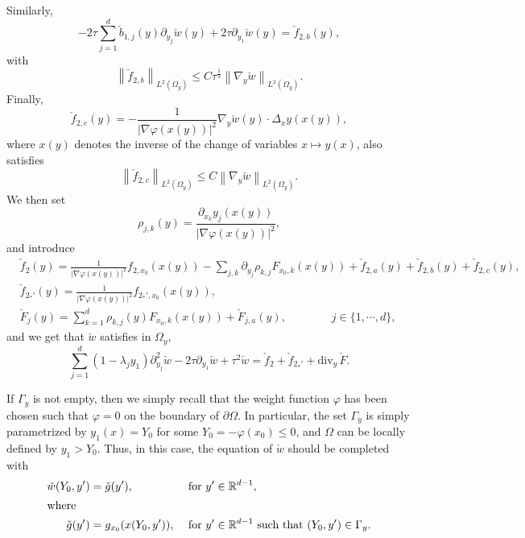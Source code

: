 \documentclass[AHL,Unicode,longabstracts]{cedram}
\newcommand*\R{\mathbb{R}}
\renewcommand{\leq}{\leqslant}
\begin{document}
Similarly,
\[
-2 \tau \sum_{j = 1}^d \check b_{1,j}(y) \partial_{y_j} \check w(y) + 2 \tau \partial_{y_1} \check w(y) =
\check f_{2,b}(y),
\]
with
\begin{equation*}
\left\| \check f_{2,b} \right\|_{L^2(\Omega_y)} \leq C \tau^{\frac{1}{3}} \left\| \nabla_y \check w\right\|_{L^2(\Omega_y)}.
\end{equation*}
Finally,
\[
\check f_{2,c} (y) = -\frac{1}{|\nabla \varphi(x(y))|^2} \nabla_y \check w(y) \cdot \Delta_x y(x(y)),
\]
where $x(y)$ denotes the inverse of the change of variables $x \mapsto y(x)$, also satisfies
\begin{equation*}
\left\| \check f_{2,c} \right\|_{L^2(\Omega_y)} \leq C \left\| \nabla_y \check w\right\|_{L^2(\Omega_y)}.
\end{equation*}
We then set
\[
\rho_{j,k}(y) = \frac{\partial_{x_k} y_j(x(y))}{|\nabla \varphi(x(y))|^2},
\]
and introduce
\begin{align*}
&
\check f_{2}(y) = \frac{1}{|\nabla \varphi(x(y))|^2} f_{2,x_0}(x(y)) - \sum_{j,k} \partial_{y_j} \rho_{k,j} F_{x_0,k}(x(y)) + \check f_{2,a}(y) + \check f_{2,b}(y) + \check f_{2,c} (y),
\\
&\check f_{2_*'}(y) = \frac{1}{|\nabla \varphi(x(y))|^2} f_{2_*',x_0}(x(y)),
\\
& \check F_j (y) = \sum_{k = 1}^d \rho_{k,j}(y) F_{x_0,k}(x(y))+ \check F_{j,a}(y), \qquad \qquad j \in \{1, \cdots, d\},
\end{align*}
and we get that $\check w$ satisfies in $\Omega_y$,
\[
\sum_{j = 1}^d (1 - \lambda_j y_1) \partial_{y_j}^2 \check w - 2 \tau \partial_{y_1} \check w +
\tau^2 \check w =
\check f_{2} +
\check f_{2_*'} +
\text{div}_y\, \check F.
\]

If $\Gamma_y$ is not empty, then we simply recall that the weight function $\varphi$ has been chosen such that $\varphi = 0$ on the boundary of $\partial \Omega$. In particular, the set $\Gamma_y$ is simply parametrized by $ y_1(x) = Y_0$ for some $Y_0 = - \varphi(x_0) \leq 0$, and $\Omega$ can be locally defined by $y_1 > Y_{0}$. Thus, in this case, the equation of $\check w$ should be completed with
\begin{align*}
\check w(Y_{0}, y') &= \check g(y'),  &&\text{ for } y' \in \R^{d-1},
\\
\intertext{where}
\check g(y') &= g_{x_0}(x(Y_0, y')),  &&\text{ for } y' \in \R^{d-1} \text{ such that } (Y_0, y') \in \Gamma_y.
\end{align*}
\end{document}
